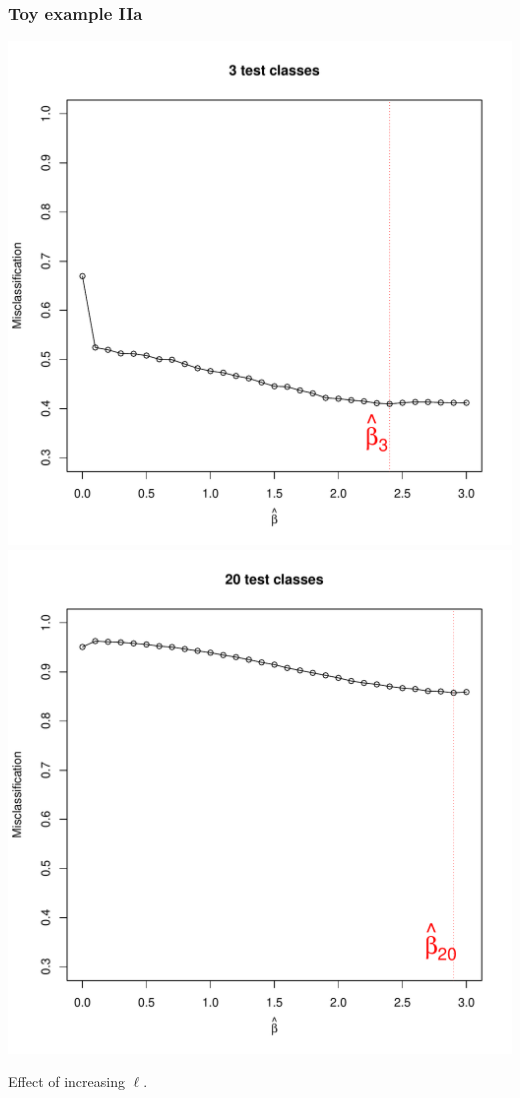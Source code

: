 \documentclass{beamer}
\begin{document}
\begin{frame}
\frametitle{Toy example IIa}
\begin{center}
\includegraphics[scale = 0.3]{toy3a_l3.pdf}
\includegraphics[scale = 0.3]{toy3a_l20.pdf}
\end{center}
Effect of increasing $\ell$.
\end{frame}
\end{document}
